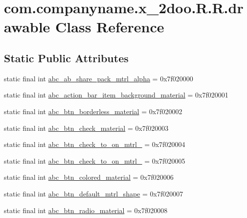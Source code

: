 \hypertarget{classcom_1_1companyname_1_1x__2doo_1_1_r_1_1drawable}{
\section{com.companyname.x\_\-2doo.R.R.drawable Class Reference}
\label{classcom_1_1companyname_1_1x__2doo_1_1_r_1_1drawable}
}
\subsection*{Static Public Attributes}
\begin{CompactItemize}
\item 
static final int \hyperlink{classcom_1_1companyname_1_1x__2doo_1_1_r_1_1drawable_85377b75bc69d9eabac495d6f4c94d2e}{abc\_\-ab\_\-share\_\-pack\_\-mtrl\_\-alpha} = 0x7f020000
\item 
static final int \hyperlink{classcom_1_1companyname_1_1x__2doo_1_1_r_1_1drawable_ec61c4293d3f654e0af034fe3ce9d120}{abc\_\-action\_\-bar\_\-item\_\-background\_\-material} = 0x7f020001
\item 
static final int \hyperlink{classcom_1_1companyname_1_1x__2doo_1_1_r_1_1drawable_3e51b7cd7ac6d684ad630d8a59a889f5}{abc\_\-btn\_\-borderless\_\-material} = 0x7f020002
\item 
static final int \hyperlink{classcom_1_1companyname_1_1x__2doo_1_1_r_1_1drawable_75fbc0dffe54507c2f8d5619282db70e}{abc\_\-btn\_\-check\_\-material} = 0x7f020003
\item 
static final int \hyperlink{classcom_1_1companyname_1_1x__2doo_1_1_r_1_1drawable_4b3de930787877484d65c6736a5127c2}{abc\_\-btn\_\-check\_\-to\_\-on\_\-mtrl\_} = 0x7f020004
\item 
static final int \hyperlink{classcom_1_1companyname_1_1x__2doo_1_1_r_1_1drawable_eb4eb148e4f96e459d8caba845d9170b}{abc\_\-btn\_\-check\_\-to\_\-on\_\-mtrl\_} = 0x7f020005
\item 
static final int \hyperlink{classcom_1_1companyname_1_1x__2doo_1_1_r_1_1drawable_f57ed0ecb3947ecad3e7a5b124c0b969}{abc\_\-btn\_\-colored\_\-material} = 0x7f020006
\item 
static final int \hyperlink{classcom_1_1companyname_1_1x__2doo_1_1_r_1_1drawable_826506b3b79bafe18feba716303e3592}{abc\_\-btn\_\-default\_\-mtrl\_\-shape} = 0x7f020007
\item 
static final int \hyperlink{classcom_1_1companyname_1_1x__2doo_1_1_r_1_1drawable_e08345244e7206313040b3b2ce157df6}{abc\_\-btn\_\-radio\_\-material} = 0x7f020008

\end{CompactItemize}
